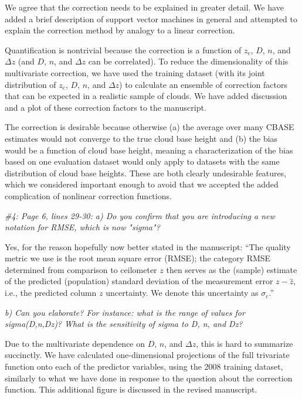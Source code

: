 \documentclass[12pt,a4paper]{responses}
\begin{document}
We agree that the correction needs to be explained in greater detail.  We have
added a brief description of support vector machines in general and attempted to
explain the correction method by analogy to a linear correction.  

Quantification is nontrivial because the correction is a function of $z_\text{c}$, $D$,
$n$, and $\Delta z$ (and $D$, $n$, and $\Delta z$ can be correlated).  To
reduce the dimensionality of this multivariate correction, we have used the
training dataset (with its joint distribution of $z_\text{c}$, $D$, $n$, and
$\Delta z$) to calculate an ensemble of correction factors that can be expected
in a realistic sample of clouds.  We have added discussion and a plot of these
correction factors to the manuscript.

The correction is desirable because otherwise (a) the average over many CBASE
estimates would not converge to the true cloud base height and (b) the bias
would be a function of cloud base height, meaning a characterization of the bias
based on one evaluation dataset would only apply to datasets with the same
distribution of cloud base heights.  These are both clearly undesirable
features, which we considered important enough to avoid that we accepted the
added complication of nonlinear correction functions.

\textit{\#4: Page 6, lines 29-30: a) Do you confirm that you are introducing a new notation for
RMSE, which is now "sigma"?}

Yes, for the reason hopefully now better stated in the manuscript: ``The quality
metric we use is the root mean square error (RMSE); the category RMSE determined
from comparison to ceilometer $z$ then serves as the (sample) estimate of the
predicted (population) standard deviation of the measurement error
$z - \hat{z}$, i.e., the predicted column $z$ uncertainty.  We denote this
uncertainty as $\sigma_\text{c}$.''

\textit{b) Can you elaborate? For instance: what is the range
of values for sigma(D,n,Dz)? What is the sensitivity of sigma to D, n, and Dz?}

Due to the multivariate dependence on $D$, $n$, and $\Delta z$, this is hard to
summarize succinctly.  We have calculated one-dimensional projections of the
full trivariate function onto each of the predictor variables, using the 2008
training dataset, similarly to what we have done in response to the question
about the correction function.  This additional figure is discussed in the
revised manuscript.
\end{document}
